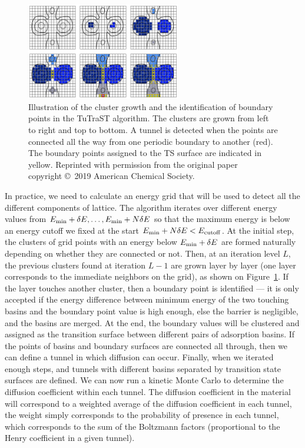 \documentclass[main]{subfiles}
\begin{document}
\begin{figure}[ht]
  \centering
    \includegraphics[width=0.6\textwidth]{figures/5-diffusion/tutrast.jpg}
    \caption{ Illustration of the cluster growth and the identification of boundary points in the TuTraST algorithm\autocite{Mace_2019}. The clusters are grown from left to right and top to bottom. A tunnel is detected when the points are connected all the way from one periodic boundary to another (red). The boundary points assigned to the TS surface are indicated in yellow. Reprinted with permission from the original paper~\cite{Mace_2019} copyright \copyright\ 2019 American Chemical Society. }\label{fgr:tutrast}
\end{figure}

In practice, we need to calculate an energy grid that will be used to detect all the different components of lattice. The algorithm iterates over different energy values from $E_{\text{min}}+\delta E, \ldots, E_{\text{min}}+N\delta E$ so that the maximum energy is below an energy cutoff we fixed at the start $E_{\text{min}}+N\delta E<E_{\text{cutoff}}$. At the initial step, the clusters of grid points with an energy below $E_{\text{min}}+\delta E$ are formed naturally depending on whether they are connected or not. Then, at an iteration level $L$, the previous clusters found at iteration $L-1$ are grown layer by layer (one layer corresponds to the immediate neighbors on the grid), as shown on Figure~\ref{fgr:tutrast}. If the layer touches another cluster, then a boundary point is identified --- it is only accepted if the energy difference between minimum energy of the two touching basins and the boundary point value is high enough, else the barrier is negligible, and the basins are merged. At the end, the boundary values will be clustered and assigned as the transition surface between different pairs of adsorption basins. If the points of basins and boundary surfaces are connected all through, then we can define a tunnel in which diffusion can occur. Finally, when we iterated enough steps, and tunnels with different basins separated by transition state surfaces are defined. We can now run a kinetic Monte Carlo to determine the diffusion coefficient within each tunnel. The diffusion coefficient in the material will correspond to a weighted average of the diffusion coefficient in each tunnel, the weight simply corresponds to the probability of presence in each tunnel, which corresponds to the sum of the Boltzmann factors (proportional to the Henry coefficient in a given tunnel). 
\end{document}
